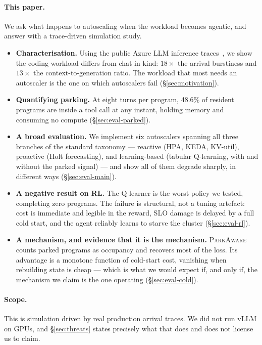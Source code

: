 \documentclass[sigconf,nonacm]{acmart}
\newcommand{\sys}{\textsc{ParkAware}\xspace}
\begin{document}
\paragraph{This paper.} We ask what happens to autoscaling when the
workload becomes agentic, and answer with a trace-driven simulation study.

\begin{itemize}
\item \textbf{Characterisation.} Using the public Azure LLM inference
  traces~\cite{splitwise}, we show the coding workload differs from chat
  in kind: $18\times$ the arrival burstiness and $13\times$ the
  context-to-generation ratio. The workload that most needs an autoscaler
  is the one on which autoscalers fail (\S\ref{sec:motivation}).

\item \textbf{Quantifying parking.} At eight turns per program, 48.6\% of
  resident programs are inside a tool call at any instant, holding memory
  and consuming no compute (\S\ref{sec:eval-parked}).

\item \textbf{A broad evaluation.} We implement six autoscalers spanning
  all three branches of the standard taxonomy --- reactive (HPA, KEDA,
  KV-util), proactive (Holt forecasting), and learning-based (tabular
  Q-learning, with and without the parked signal) --- and show all of them
  degrade sharply, in different ways (\S\ref{sec:eval-main}).

\item \textbf{A negative result on RL.} The Q-learner is the worst policy
  we tested, completing zero programs. The failure is structural, not a
  tuning artefact: cost is immediate and legible in the reward, SLO damage
  is delayed by a full cold start, and the agent reliably learns to starve
  the cluster (\S\ref{sec:eval-rl}).

\item \textbf{A mechanism, and evidence that it is the mechanism.} \sys
  counts parked programs as occupancy and recovers most of the loss. Its
  advantage is a monotone function of cold-start cost, vanishing when
  rebuilding state is cheap --- which is what we would expect if, and only
  if, the mechanism we claim is the one operating
  (\S\ref{sec:eval-cold}).
\end{itemize}

\paragraph{Scope.} This is simulation driven by real production arrival
traces. We did not run vLLM on GPUs, and \S\ref{sec:threats} states
precisely what that does and does not license us to claim.
\end{document}
